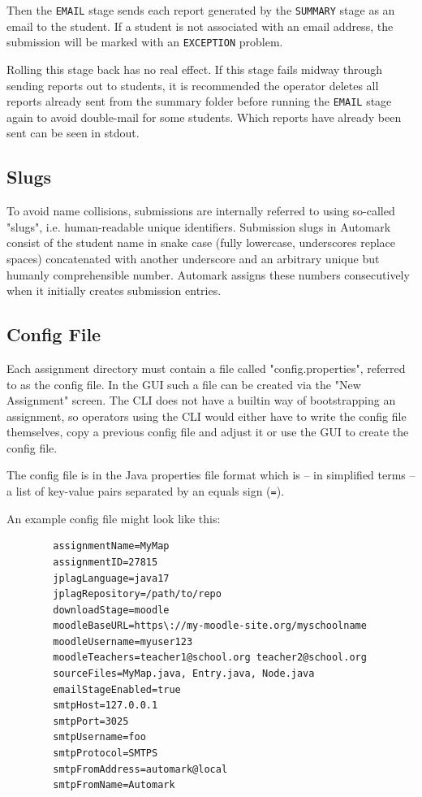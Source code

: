\documentclass[12pt,a4paper,oneside]{report}
\begin{document}
	Then the \lstinline|EMAIL| stage sends each report generated by the \lstinline|SUMMARY| stage as an email to the student. If a student is not associated with an email address, the submission will be marked with an \lstinline|EXCEPTION| problem.

	Rolling this stage back has no real effect. If this stage fails midway through sending reports out to students, it is recommended the operator deletes all reports already sent from the summary folder before running the \lstinline|EMAIL| stage again to avoid double-mail for some students. Which reports have already been sent can be seen in stdout.

	\subsection{Slugs} \label{subsec:slugs}
	To avoid name collisions, submissions are internally referred to using so-called "slugs", i.e. human-readable unique identifiers. Submission slugs in Automark consist of the student name in snake case (fully lowercase, underscores replace spaces) concatenated with another underscore and an arbitrary unique but humanly comprehensible number. Automark assigns these numbers consecutively when it initially creates submission entries.

	\subsection{Config File}
	Each assignment directory must contain a file called "config.properties", referred to as the config file. In the GUI such a file can be created via the "New Assignment" screen. The CLI does not have a builtin way of bootstrapping an assignment, so operators using the CLI would either have to write the config file themselves, copy a previous config file and adjust it or use the GUI to create the config file.

	The config file is in the Java properties file format which is -- in simplified terms -- a list of key-value pairs separated by an equals sign (\lstinline|=|).

	An example config file might look like this:
	\begin{lstlisting}
		assignmentName=MyMap
		assignmentID=27815
		jplagLanguage=java17
		jplagRepository=/path/to/repo
		downloadStage=moodle
		moodleBaseURL=https\://my-moodle-site.org/myschoolname
		moodleUsername=myuser123
		moodleTeachers=teacher1@school.org teacher2@school.org
		sourceFiles=MyMap.java, Entry.java, Node.java
		emailStageEnabled=true
		smtpHost=127.0.0.1
		smtpPort=3025
		smtpUsername=foo
		smtpProtocol=SMTPS
		smtpFromAddress=automark@local
		smtpFromName=Automark
	\end{lstlisting}
\end{document}
